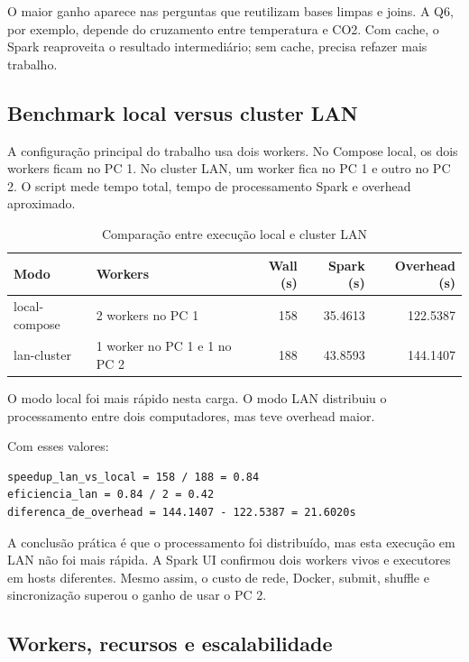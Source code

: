 \documentclass[12pt,a4paper]{article}
\begin{document}
O maior ganho aparece nas perguntas que reutilizam bases limpas e joins. A Q6, por exemplo, depende do cruzamento entre temperatura e CO2. Com cache, o Spark reaproveita o resultado intermediário; sem cache, precisa refazer mais trabalho.

\subsection{Benchmark local versus cluster LAN}

A configuração principal do trabalho usa dois workers. No Compose local, os dois workers ficam no PC 1. No cluster LAN, um worker fica no PC 1 e outro no PC 2. O script  mede tempo total, tempo de processamento Spark e overhead aproximado.

\begin{table}[H]
\centering
\caption{Comparação entre execução local e cluster LAN}
\small
\begin{tabular}{p{}p{}rrr}
\toprule
Modo & Workers & Wall (s) & Spark (s) & Overhead (s) \\
\midrule
local-compose & 2 workers no PC 1 & 158 & 35.4613 & 122.5387 \\
lan-cluster & 1 worker no PC 1 e 1 no PC 2 & 188 & 43.8593 & 144.1407 \\
\bottomrule
\end{tabular}
\normalsize
\end{table}

O modo local foi mais rápido nesta carga. O modo LAN distribuiu o processamento entre dois computadores, mas teve overhead maior.

Com esses valores:

\begin{lstlisting}
speedup_lan_vs_local = 158 / 188 = 0.84
eficiencia_lan = 0.84 / 2 = 0.42
diferenca_de_overhead = 144.1407 - 122.5387 = 21.6020s
\end{lstlisting}

A conclusão prática é que o processamento foi distribuído, mas esta execução em LAN não foi mais rápida. A Spark UI confirmou dois workers vivos e executores em hosts diferentes. Mesmo assim, o custo de rede, Docker, submit, shuffle e sincronização superou o ganho de usar o PC 2.

\subsection{Workers, recursos e escalabilidade}
\end{document}
